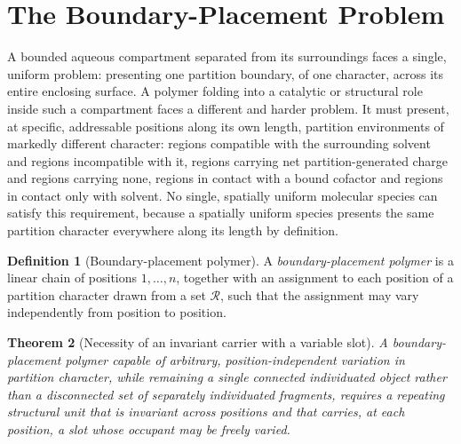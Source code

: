 \documentclass[11pt,twocolumn,a4paper]{article}
\theoremstyle{plain}
\newtheorem{theorem}{Theorem}[section]
\theoremstyle{definition}
\newtheorem{definition}[theorem]{Definition}
\theoremstyle{remark}
\newcommand{\Res}{\mathcal{R}}
\begin{document}
\section{The Boundary-Placement Problem}
\label{sec:boundary-problem}

A bounded aqueous compartment separated from its surroundings faces a
single, uniform problem: presenting one partition boundary, of one
character, across its entire enclosing surface. A polymer folding into a
catalytic or structural role inside such a compartment faces a different and
harder problem. It must present, at specific, addressable positions along
its own length, partition environments of markedly different character:
regions compatible with the surrounding solvent and regions incompatible
with it, regions carrying net partition-generated charge and regions
carrying none, regions in contact with a bound cofactor and regions in
contact only with solvent. No single, spatially uniform molecular species
can satisfy this requirement, because a spatially uniform species presents
the same partition character everywhere along its length by definition.

\begin{definition}[Boundary-placement polymer]
\label{def:placement}
A \emph{boundary-placement polymer} is a linear chain of positions
$1,\ldots,n$, together with an assignment to each position of a partition
character drawn from a set $\Res$, such that the assignment may vary
independently from position to position.
\end{definition}

\begin{theorem}[Necessity of an invariant carrier with a variable slot]
\label{thm:carrier-necessity}
A boundary-placement polymer capable of arbitrary, position-independent
variation in partition character, while remaining a single connected
individuated object rather than a disconnected set of separately
individuated fragments, requires a repeating structural unit that is
invariant across positions and that carries, at each position, a slot whose
occupant may be freely varied.
\end{theorem}
\end{document}
